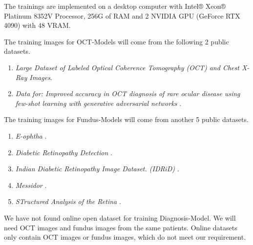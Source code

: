 \documentclass{article}
\begin{document}
		The trainings are implemented on a desktop computer with Intel® Xeon® Platinum 8352V Processor, 256G of RAM and 2 NVIDIA GPU (GeForce RTX 4090) with 48 VRAM.
		
		\vspace{0.3cm}
		
		The training images for OCT-Models will come from the following 2 public datasets.
		\begin{enumerate}
			\vspace{-0.2cm}
			\item \textit{Large Dataset of Labeled Optical Coherence Tomography (OCT) and Chest X-Ray Images}\autocite{Kermany_database}.
			\vspace{-0.2cm}
			\item \textit{Data for: Improved accuracy in OCT diagnosis of rare ocular disease using few-shot learning with generative adversarial networks} \autocite{Yoo_2020}.
		\end{enumerate}
		
		\vspace{0.3cm}
		
		The training images for Fundus-Models will come from another 5 public datasets.
		\begin{enumerate}
			\vspace{-0.2cm}
			\item \textit{E-ophtha} \autocite{E_ophtha}.
			\vspace{-0.2cm}
			\item \textit{Diabetic Retinopathy Detection} \autocite{DR_dataset}.
			\vspace{-0.2cm}
			\item \textit{Indian Diabetic Retinopathy Image Dataset. (IDRiD)} \autocite{Porwal_2018}.
			\vspace{-0.2cm}
			\item \textit{Messidor} \autocite{Messidor}.
			\vspace{-0.2cm}
			\item \textit{STructured Analysis of the Retina} \autocite{STARE}.
		\end{enumerate}
		
		\vspace{0.3cm}
		
		We have not found online open dataset for training Diagnosis-Model.  We will need OCT images and fundus images from the same patients.  Online datasets only contain OCT images or fundus images, which do not meet our requirement.
		
\end{document}
